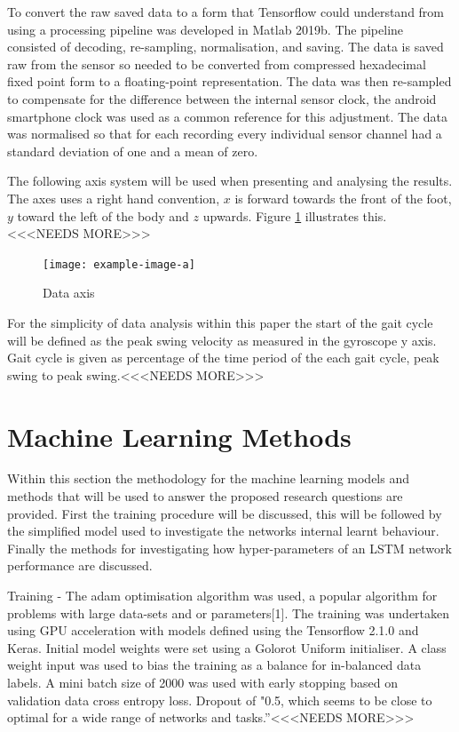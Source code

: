 \documentclass[sensors,article,submit,moreauthors,pdftex]{Definitions/mdpi}
\begin{document}
To convert the raw saved data to a form that Tensorflow could understand from using a processing pipeline was developed in Matlab 2019b. The pipeline consisted of decoding, re-sampling, normalisation, and saving. The data is saved raw from the sensor so needed to be converted from compressed hexadecimal fixed point form to a floating-point representation. The data was then re-sampled to compensate for the difference between the internal sensor clock, the android smartphone clock was used as a common reference for this adjustment. The data was normalised so that for each recording every individual sensor channel had a standard deviation of one and a mean of zero.

The following axis system will be used when presenting and analysing the results. The axes uses a right hand convention, $x$ is forward towards the front of the foot, $y$ toward the left of the body and $z$ upwards. Figure \ref{fig:data_axis} illustrates this.<<<NEEDS MORE>>>
\begin{figure}[!htb]
    \centering
    \texttt{[image: example-image-a]}
    \caption{Data axis}
    \label{fig:data_axis}
\end{figure}

For the simplicity of data analysis within this paper the start of the gait cycle will be defined as the peak swing velocity as measured in the gyroscope y axis. Gait cycle is given as percentage of the time period of the each gait cycle, peak swing to peak swing.<<<NEEDS MORE>>>

\section{Machine Learning Methods}
Within this section the methodology for the machine learning models and methods that will be used to answer the proposed research questions are provided. First the training procedure will be discussed, this will be followed by the simplified model used to investigate the networks internal learnt behaviour. Finally the methods for investigating how hyper-parameters of an LSTM network performance are discussed.

Training - The adam optimisation algorithm was used, a popular algorithm for problems with large data-sets and or parameters[1]. The training was undertaken using GPU acceleration with models defined using the Tensorflow 2.1.0 and Keras. Initial model weights were set using a Golorot Uniform initialiser. A class weight input was used to bias the training as a balance for in-balanced data labels. A mini batch size of 2000 was used with early stopping based on validation data cross entropy loss. Dropout of "0.5, which seems to be close to optimal for a wide range of networks and tasks.”\cite{Srivastava2014}<<<NEEDS MORE>>>
\end{document}
